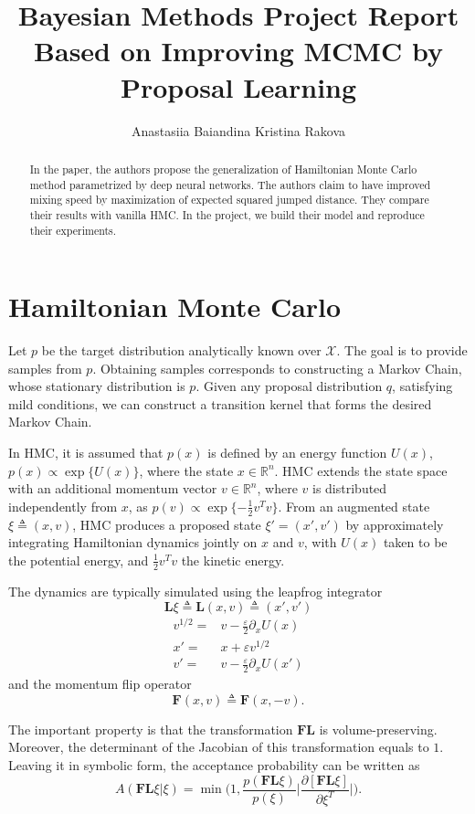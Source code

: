 \documentclass{article}
\title{Bayesian Methods Project Report \\
Based on Improving MCMC by Proposal Learning}
\author{
  Anastasiia Baiandina
   \And
 Kristina Rakova
}
\begin{document}
\maketitle

\begin{abstract}
In the paper, the authors propose the generalization of Hamiltonian Monte Carlo method parametrized by deep neural networks. The authors claim to have improved mixing speed by maximization of expected squared jumped distance. They compare their results with vanilla HMC. In the project, we build their model and reproduce their experiments.
\end{abstract}


\section*{Hamiltonian Monte Carlo}
Let $p$ be the target distribution analytically known over $\mathcal{X}$. The goal is to provide samples from $p$. Obtaining samples corresponds to constructing a Markov Chain, whose stationary distribution is $p$. Given any proposal distribution $q$, satisfying mild conditions, we can construct a transition kernel that forms the desired Markov Chain.

In HMC, it is assumed that $p(x)$ is defined by an energy function $U(x)$, $p(x) \propto \exp \{ U(x) \}$, where the state $x \in \mathbb{R}^n$. HMC extends the state space with an additional momentum vector $v \in \mathbb{R}^n$, where $v$ is distributed independently from $x$, as $p(v) \propto \exp \{-\frac{1}{2} v^T v\}$. From an augmented state $\xi \triangleq (x, v)$, HMC produces a proposed state $\xi' = (x', v')$ by approximately integrating Hamiltonian dynamics jointly on $x$ and $v$, with $U(x)$ taken to be the potential energy, and $\frac{1}{2} v^T v$ the kinetic energy.

The dynamics are typically simulated using the leapfrog integrator
\[
    \mathbf{L}\xi \triangleq \mathbf{L}(x, v) \triangleq (x', v')
\]
\begin{eqnarray*}
v^{1/2} = & v - \frac{\varepsilon}{2} \partial_x U(x) \\
x' = & x + \varepsilon v^{1/2} \\
v' = & v - \frac{\varepsilon}{2} \partial_x U(x')
\end{eqnarray*}
and the momentum flip operator
\[
    \mathbf{F}(x, v) \triangleq \mathbf{F}(x, -v).
\]

The important property is that the transformation $\mathbf{FL}$ is volume-preserving. Moreover, the determinant of the Jacobian of this transformation equals to $1$. Leaving it in symbolic form, the acceptance probability can be written as
\[
    A(\mathbf{FL}\xi | \xi) = \min \Big( 1, \frac{p(\mathbf{FL}\xi)}{p(\xi)} \Big| \frac{\partial [\mathbf{FL}\xi]}{\partial \xi^T} \Big| \Big).
\]
\end{document}
